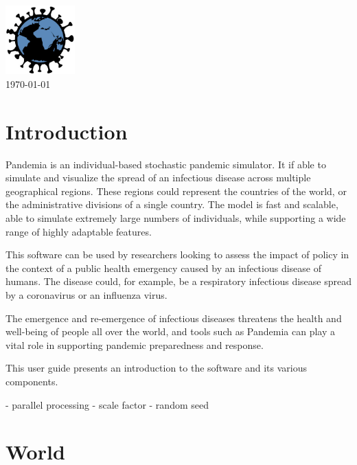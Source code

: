 \documentclass[10pt,letterpaper]{article}
\begin{document}


\vspace*{0.2in}

\begin{centering}
{\Huge\textbf{}}
\\
\bigskip
\includegraphics[width=0.2\textwidth]{pandemia_logo}
\\
\bigskip
\today
\\
\end{centering}

\tableofcontents

\section{Introduction}

Pandemia is an individual-based stochastic pandemic simulator. It if able to simulate and visualize the spread of an infectious disease across multiple geographical regions. These regions could represent the countries of the world, or the administrative divisions of a single country. The model is fast and scalable, able to simulate extremely large numbers of individuals, while supporting a wide range of highly adaptable features.

This software can be used by researchers looking to assess the impact of policy in the context of a public health emergency caused by an infectious disease of humans. The disease could, for example, be a respiratory infectious disease spread by a coronavirus or an influenza virus.

The emergence and re-emergence of infectious diseases threatens the health and well-being of people all over the world, and tools such as Pandemia can play a vital role in supporting pandemic preparedness and response.

This user guide presents an introduction to the software and its various components.

- parallel processing
- scale factor
- random seed

\section{World}
\end{document}
